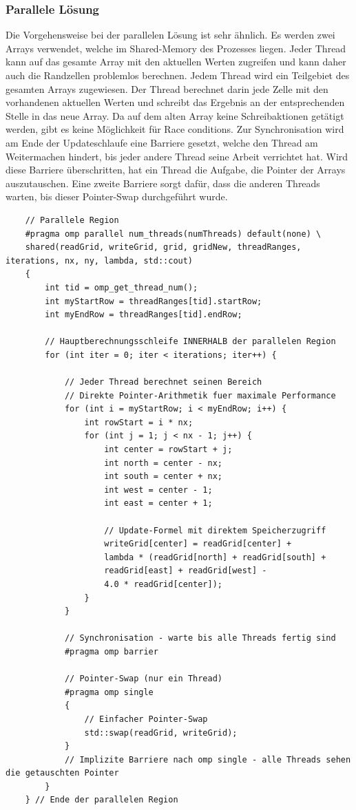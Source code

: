 \subsubsection{Parallele Lösung 
\label{parallelisierung:sub:parLoesung}}
Die Vorgehensweise bei der parallelen Lösung ist sehr ähnlich.
Es werden zwei Arrays verwendet, welche im Shared-Memory des Prozesses liegen.
Jeder Thread kann auf das gesamte Array mit den aktuellen Werten zugreifen und kann daher auch die Randzellen problemlos berechnen.
Jedem Thread wird ein Teilgebiet des gesamten Arrays zugewiesen.
Der Thread berechnet darin jede Zelle mit den vorhandenen aktuellen Werten und schreibt das Ergebnis an der entsprechenden Stelle in das neue Array.
Da auf dem alten Array keine Schreibaktionen getätigt werden, gibt es keine Möglichkeit für Race conditions.
Zur Synchronisation wird am Ende der Updateschlaufe eine Barriere gesetzt, welche den Thread am Weitermachen hindert, bis jeder andere Thread seine Arbeit verrichtet hat.
Wird diese Barriere überschritten, hat ein Thread die Aufgabe, die Pointer der Arrays auszutauschen.
Eine zweite Barriere sorgt dafür, dass die anderen Threads warten, bis dieser Pointer-Swap durchgeführt wurde.

\begin{lstlisting}
	// Parallele Region
	#pragma omp parallel num_threads(numThreads) default(none) \
	shared(readGrid, writeGrid, grid, gridNew, threadRanges, iterations, nx, ny, lambda, std::cout)
	{
		int tid = omp_get_thread_num();
		int myStartRow = threadRanges[tid].startRow;
		int myEndRow = threadRanges[tid].endRow;
		
		// Hauptberechnungsschleife INNERHALB der parallelen Region
		for (int iter = 0; iter < iterations; iter++) {
			
			// Jeder Thread berechnet seinen Bereich
			// Direkte Pointer-Arithmetik fuer maximale Performance
			for (int i = myStartRow; i < myEndRow; i++) {
				int rowStart = i * nx;
				for (int j = 1; j < nx - 1; j++) {
					int center = rowStart + j;
					int north = center - nx;
					int south = center + nx;
					int west = center - 1;
					int east = center + 1;
					
					// Update-Formel mit direktem Speicherzugriff
					writeGrid[center] = readGrid[center] +
					lambda * (readGrid[north] + readGrid[south] +
					readGrid[east] + readGrid[west] -
					4.0 * readGrid[center]);
				}
			}
			
			// Synchronisation - warte bis alle Threads fertig sind
			#pragma omp barrier
			
			// Pointer-Swap (nur ein Thread)
			#pragma omp single
			{
				// Einfacher Pointer-Swap
				std::swap(readGrid, writeGrid);
			}
			// Implizite Barriere nach omp single - alle Threads sehen die getauschten Pointer
		}
	} // Ende der parallelen Region
\end{lstlisting}
	
